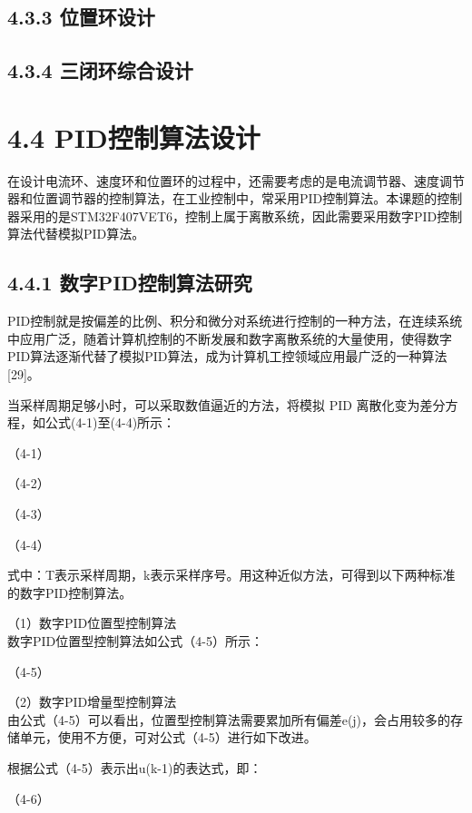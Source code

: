 \documentclass[UTF8,zihao=-4,openany,oneside]{ctexbook}
\begin{document}
\subsection{4.3.3 位置环设计}

\subsection{4.3.4 三闭环综合设计}

\section{4.4 PID控制算法设计}

在设计电流环、速度环和位置环的过程中，还需要考虑的是电流调节器、速度调节器和位置调节器的控制算法，在工业控制中，常采用PID控制算法。本课题的控制器采用的是STM32F407VET6，控制上属于离散系统，因此需要采用数字PID控制算法代替模拟PID算法。

\subsection{4.4.1 数字PID控制算法研究}

PID控制就是按偏差的比例、积分和微分对系统进行控制的一种方法，在连续系统中应用广泛，随着计算机控制的不断发展和数字离散系统的大量使用，使得数字PID算法逐渐代替了模拟PID算法，成为计算机工控领域应用最广泛的一种算法[29]。

当采样周期足够小时，可以采取数值逼近的方法，将模拟 PID 离散化变为差分方程，如公式(4-1)至(4-4)所示：

（4-1）

（4-2）

（4-3）

（4-4）

式中：T表示采样周期，k表示采样序号。用这种近似方法，可得到以下两种标准的数字PID控制算法。

\noindent （1）数字PID位置型控制算法\\

数字PID位置型控制算法如公式（4-5）所示：

（4-5）

\noindent （2）数字PID增量型控制算法\\

由公式（4-5）可以看出，位置型控制算法需要累加所有偏差e(j)，会占用较多的存储单元，使用不方便，可对公式（4-5）进行如下改进。

根据公式（4-5）表示出u(k-1)的表达式，即：

（4-6）
\end{document}
